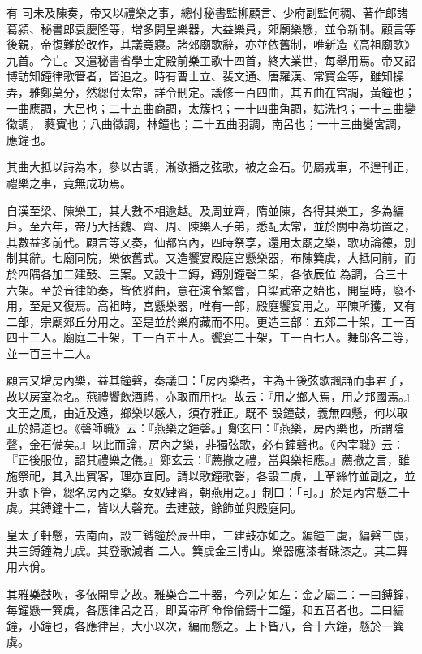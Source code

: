 \begin{pinyinscope}
 有
 司未及陳奏，帝又以禮樂之事，總付秘書監柳顧言、少府副監何稠、著作郎諸葛潁、秘書郎袁慶隆等，增多開皇樂器，大益樂員，郊廟樂懸，並令新制。顧言等後親，帝復難於改作，其議竟寢。諸郊廟歌辭，亦並依舊制，唯新造《高祖廟歌》九首。今亡。又遣秘書省學士定殿前樂工歌十四首，終大業世，每舉用焉。帝又詔博訪知鐘律歌管者，皆追之。時有曹士立、裴文通、唐羅漢、常寶金等，雖知操弄，雅鄭莫分，然總付太常，詳令刪定。議修一百四曲，其五曲在宮調，黃鐘也；一曲應調，大呂也；二十五曲商調，太簇也；一十四曲角調，姑洗也；一十三曲變徵調，
 蕤賓也；八曲徵調，林鐘也；二十五曲羽調，南呂也；一十三曲變宮調，應鐘也。



 其曲大抵以詩為本，參以古調，漸欲播之弦歌，被之金石。仍屬戎車，不遑刊正，禮樂之事，竟無成功焉。



 自漢至梁、陳樂工，其大數不相逾越。及周並齊，隋並陳，各得其樂工，多為編戶。至六年，帝乃大括魏、齊、周、陳樂人子弟，悉配太常，並於關中為坊置之，其數益多前代。顧言等又奏，仙都宮內，四時祭享，還用太廟之樂，歌功論德，別制其辭。七廟同院，樂依舊式。又造饗宴殿庭宮懸樂器，布陳簨虡，大抵同前，而於四隅各加二建鼓、三案。又設十二鎛，鎛別鐘磬二架，各依辰位
 為調，合三十六架。至於音律節奏，皆依雅曲，意在演令繁會，自梁武帝之始也，開皇時，廢不用，至是又復焉。高祖時，宮懸樂器，唯有一部，殿庭饗宴用之。平陳所獲，又有二部，宗廟郊丘分用之。至是並於樂府藏而不用。更造三部：五郊二十架，工一百四十三人。廟庭二十架，工一百五十人。饗宴二十架，工一百七人。舞郎各二等，並一百三十二人。



 顧言又增房內樂，益其鐘磬，奏議曰：「房內樂者，主為王後弦歌諷誦而事君子，故以房室為名。燕禮饗飲酒禮，亦取而用也。故云：『用之鄉人焉，用之邦國焉。』文王之風，由近及遠，鄉樂以感人，須存雅正。既不
 設鐘鼓，義無四懸，何以取正於婦道也。《磬師職》云：『燕樂之鐘磬。」鄭玄曰：『燕樂，房內樂也，所謂陰聲，金石備矣。』以此而論，房內之樂，非獨弦歌，必有鐘磬也。《內宰職》云：『正後服位，詔其禮樂之儀。』鄭玄云：『薦撤之禮，當與樂相應。』薦撤之言，雖施祭祀，其入出賓客，理亦宜同。請以歌鐘歌磬，各設二虡，土革絲竹並副之，並升歌下管，總名房內之樂。女奴肄習，朝燕用之。」制曰：「可。」於是內宮懸二十虡。其鎛鐘十二，皆以大磬充。去建鼓，餘飾並與殿庭同。



 皇太子軒懸，去南面，設三鎛鐘於辰丑申，三建鼓亦如之。編鐘三虡，編磬三虡，共三鎛鐘為九虡。其登歌減者
 二人。簨虡金三博山。樂器應漆者硃漆之。其二舞用六佾。



 其雅樂鼓吹，多依開皇之故。雅樂合二十器，今列之如左：金之屬二：一曰鎛鐘，每鐘懸一簨虡，各應律呂之音，即黃帝所命伶倫鑄十二鐘，和五音者也。二曰編鐘，小鐘也，各應律呂，大小以次，編而懸之。上下皆八，合十六鐘，懸於一簨虡。




\end{pinyinscope}
